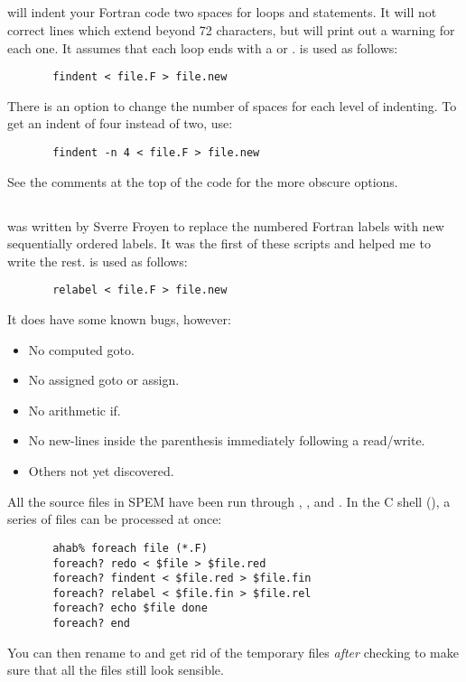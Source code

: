 \subsection{}
 will indent your Fortran code two spaces for 
loops and  statements.  It will not correct lines which extend
beyond 72 characters, but will print out a warning for each one.  It
assumes that each  loop ends with a  or
.   is used as follows:
\begin{verbatim}
       findent < file.F > file.new
\end{verbatim}
There is an option to change the number of spaces for each level of
indenting.  To get an indent of four instead of two, use:
\begin{verbatim}
       findent -n 4 < file.F > file.new
\end{verbatim}
See the comments at the top of the code for the more obscure options.

\subsection{}
 was written by Sverre Froyen to replace the numbered
Fortran labels with new sequentially ordered labels.  It was the first
of these scripts and helped me to write the rest.   is
used as follows:
\begin{verbatim}
       relabel < file.F > file.new
\end{verbatim}
It does have some known bugs, however:
\begin{itemize}
\item No computed goto.
\item No assigned goto or assign.
\item No arithmetic if.
\item No new-lines inside the parenthesis immediately following a
read/write.
\item Others not yet discovered.
\end{itemize}

All the source files in SPEM have been run through ,
, and .  In the C shell (), a
series of files can be processed at once:
\begin{verbatim}
       ahab% foreach file (*.F)
       foreach? redo < $file > $file.red
       foreach? findent < $file.red > $file.fin
       foreach? relabel < $file.fin > $file.rel
       foreach? echo $file done
       foreach? end
\end{verbatim}
You can then rename  to  and get rid of
the temporary files {\sl after} checking to make sure that all the
files still look sensible.

